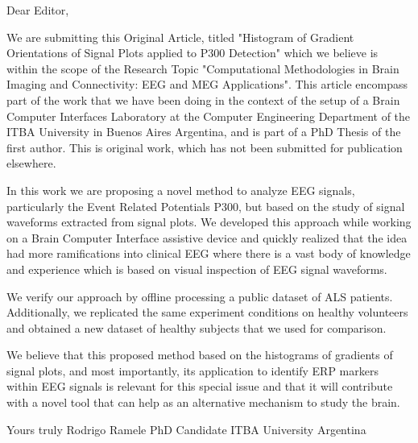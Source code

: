 Dear Editor, 

We are submitting this Original Article, titled "Histogram of Gradient Orientations of Signal Plots applied to P300 Detection" which we believe is within the scope of the Research Topic "Computational Methodologies in Brain Imaging and Connectivity: EEG and MEG Applications".  This article encompass part of the work that we have been doing in the context of the setup of a Brain Computer Interfaces Laboratory at the Computer Engineering Department of the ITBA University in Buenos Aires Argentina, and is part of a PhD Thesis of the first author.  This is original work, which has not been submitted for publication elsewhere.

In this work we are proposing a novel method to analyze EEG signals, particularly the Event Related Potentials P300, but based on the study of signal waveforms extracted from signal plots.  We developed this approach while working on a Brain Computer Interface assistive device and quickly realized that the idea had more ramifications into clinical EEG where there is a vast body of knowledge and experience which is based on visual inspection of EEG signal waveforms.

We verify our approach by offline processing a public dataset of ALS patients.  Additionally, we replicated the same experiment conditions on healthy volunteers and obtained a new dataset of healthy subjects that we used for comparison.  

We believe that this proposed method based on the histograms of gradients of signal plots, and most importantly, its  application to identify ERP markers within EEG signals is relevant for this special issue and that it will contribute with a novel tool that can help as an alternative mechanism to study the brain.

Yours truly
Rodrigo Ramele
PhD Candidate
ITBA University 
Argentina